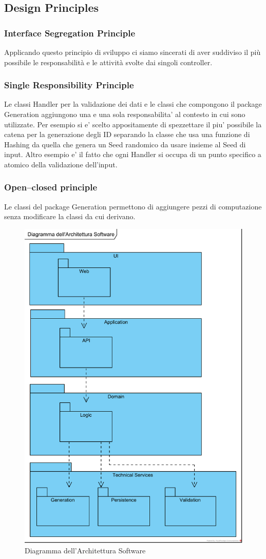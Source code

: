 \documentclass[a4paper,12pt]{report}
\begin{document}
		\subsection{Design Principles}
			\subsubsection{Interface Segregation Principle}		
Applicando questo principio di sviluppo ci siamo sincerati di aver suddiviso il più possibile le responsabilità e le attività svolte dai singoli controller.
			\subsubsection{Single Responsibility Principle}
Le classi Handler per la validazione dei dati e le classi che compongono il package Generation aggiungono una e una sola responsabilita' al contesto in cui sono utilizzate.
Per esempio si e' scelto appositamente di spezzettare il piu' possibile la catena per la generazione degli ID separando la classe che usa una funzione di Hashing da quella che genera un Seed randomico da usare insieme al Seed di input.
Altro esempio e' il fatto che ogni Handler si occupa di un punto specifico a atomico della validazione dell'input.
			\subsubsection{Open–closed principle}
Le classi del package Generation permettono di aggiungere pezzi di computazione senza modificare la classi da cui derivano.
		\begin{figure}[!h]
			\centering
			\includegraphics[width=0.6\linewidth]{image/Diagramma-dell'Architettura-Software.png}
			\caption{Diagramma dell'Architettura Software}\label{fig:Diagramma-dell'Architettura-Software.}
		\end{figure}         
         
\end{document}

